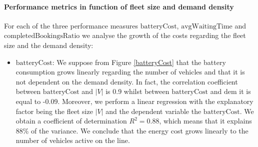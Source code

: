 \documentclass[12pt,a4paper]{article}
\begin{document}
\paragraph{Performance metrics in function of fleet size and demand density}
For each of the three performance measures $\text{batteryCost}$, $\text{avgWaitingTime}$ and $\text{completedBookingsRatio}$ we analyse the growth of the costs regarding the fleet size and the demand density:
\begin{itemize}
\item $\text{batteryCost}$: We suppose from Figure \ref{batteryCost} that the battery consumption grows linearly regarding the number of vehicles and that it is not dependent on the demand density. In fact, the correlation coefficient between $\text{batteryCost}$ and $|V|$ is 0.9 whilst between $\text{batteryCost}$ and $\text{dem}$ it is equal to -0.09. Moreover, we perform a linear regression with the explanatory factor being the fleet size $|V|$ and the dependent variable the $\text{batteryCost}$. We obtain a coefficient of determination $R^{2} = 0.88$, which means that it explains 88\% of the variance. We conclude that the energy cost grows linearly to the number of vehicles active on the line. 


\end{itemize}
\end{document}
